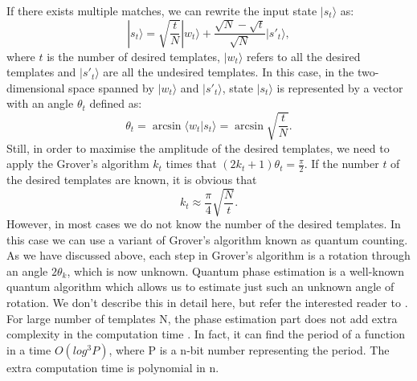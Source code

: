 \documentclass[aps,prd,nofootinbib,twocolumn,reprint,superscriptaddress,showpacs,showkeys,longbibliography]{revtex4-1}
\newcommand{\ket}[1]{|#1\rangle}
\newcommand{\braket}[2]{\langle #1|#2\rangle}
\begin{document}
If there exists multiple matches, we can rewrite the input state $\ket{s_t}$ as:
\begin{equation}
    \label{som}
    \ket{s_t}=\sqrt{\frac{t}{N}}\ket{w_t}+\frac{\sqrt{N}-\sqrt{t}}{\sqrt{N}}\ket{s'_t},
\end{equation}
where $t$ is the number of desired templates, $\ket{w_t}$ refers to all the desired templates and $\ket{s'_t}$ are all the undesired templates. In this case, in the two-dimensional space spanned by $\ket{w_t}$ and $\ket{s'_t}$, state $\ket{s_t}$ is represented by a vector with an angle $\theta_t$ defined as:
\begin{equation}
\label{thetat}
   \theta_t=\arcsin\braket{w_t}{s_t}=\arcsin {\sqrt{\frac{t}{N}}}. 
\end{equation}
Still, in order to maximise the amplitude of the desired templates, we need to apply the Grover's algorithm $k_t$ times that $(2k_t+1)\theta_t=\frac{\pi}{2}$. If the number $t$ of the desired templates are known, it is obvious that
\begin{equation}
\label{kt}
    k_t\approx\frac{\pi}{4}\sqrt{\frac{N}{t}}.
\end{equation}
However, in most cases we do not know the number of the desired templates. In this case we can use a variant of Grover's algorithm known as quantum counting\cite{brassard1998quantum}. As we have discussed above, each step in Grover's algorithm is a rotation through an angle $2 \theta_k$, which is now unknown. Quantum phase estimation is a well-known quantum algorithm which allows us to estimate just such an unknown angle of rotation. We don't describe this in detail here, but refer the interested reader to \cite{nielsen2002quantum}. For large number of templates N, the phase estimation part does not add extra complexity in the computation time \cite{brassard1998quantum}. In fact, it can find the period of a function in a time $O(log^3P)$, where P is a n-bit number representing the period. The extra computation time is polynomial in n.\cite{barnett2009quantum}
\end{document}
